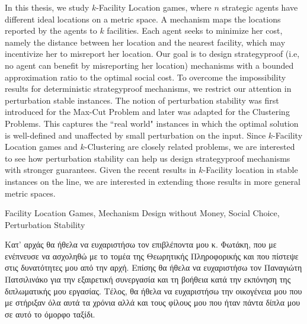 \documentclass[diploma]{softlab-thesis}
\begin{document}

\begin{abstracten}%
In this thesis, we study $k$-Facility Location games, where $n$ strategic agents have different ideal locations on a metric space. A mechanism maps the locations reported by the agents to $k$ facilities. Each agent seeks to minimize her cost, namely the distance between her location and the nearest facility, which may incentivize her to misreport her location. Our goal is to design strategyproof (i.e, no agent can benefit by misreporting her location) mechanisms with a bounded approximation ratio to the optimal social cost. To overcome the impossibility results for deterministic strategyproof mechanisms, we restrict our attention in perturbation stable instances. The notion of perturbation stability was first introduced for the Max-Cut Problem and later was adapted for the Clustering Problems. This captures the ``real world" instances in which the optimal solution is well-defined and unaffected by small perturbation on the input. Since $k$-Facility Location games and $k$-Clustering are closely related problems, we are interested to see how perturbation stability can help us design strategyproof mechanisms with stronger guarantees. Given the recent results in $k$-Facility location in stable instances on the line, we are interested in extending those results in more general metric spaces. 
 
\begin{keywordsen}
Facility Location Games, Mechanism Design without Money, Social Choice, Perturbation Stability
\end{keywordsen}
\end{abstracten}



\begin{acknowledgementsgr}
Κατ' αρχάς θα ήθελα να ευχαριστήσω τον επιβλέποντα μου κ. Φωτάκη, που με ενέπνευσε να ασχοληθώ με το τομέα της Θεωρητικής Πληροφορικής και που πίστεψε στις δυνατότητες μου από την αρχή. Επίσης θα ήθελα να ευχαριστήσω τον Παναγιώτη Πατσιλινάκο για την εξαιρετική συνεργασία και τη βοήθεια κατά την εκπόνηση της διπλωματικής μου εργασίας. Τέλος, θα ήθελα να ευχαριστήσω την οικογένεια μου που με στήριξαν όλα αυτά τα χρόνια αλλά και τους φίλους μου που ήταν πάντα δίπλα μου σε αυτό το όμορφο ταξίδι.
\end{acknowledgementsgr}



\tableofcontents
\listoffigures
\end{document}
